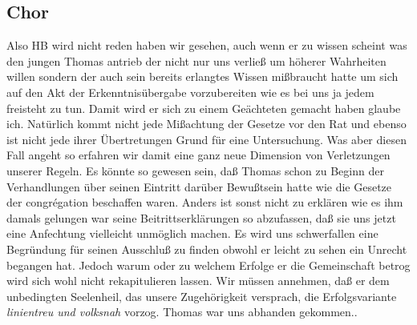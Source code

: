\documentclass[
]{article}
\author{}
\date{\vspace{-2.5em}}
\begin{document}
\subsection{Chor}\label{chor}

Also HB wird nicht reden haben wir gesehen, auch wenn er zu wissen
scheint was den jungen Thomas antrieb der nicht nur uns verließ um
höherer Wahrheiten willen sondern der auch sein bereits erlangtes Wissen
mißbraucht hatte um sich auf den Akt der Erkenntnisübergabe
vorzubereiten wie es bei uns ja jedem freisteht zu tun. Damit wird er
sich zu einem Geächteten gemacht haben glaube ich. Natürlich kommt nicht
jede Mißachtung der Gesetze vor den Rat und ebenso ist nicht jede ihrer
Übertretungen Grund für eine Untersuchung. Was aber diesen Fall angeht
so erfahren wir damit eine ganz neue Dimension von Verletzungen unserer
Regeln. Es könnte so gewesen sein, daß Thomas schon zu Beginn der
Verhandlungen über seinen Eintritt darüber Bewußtsein hatte wie die
Gesetze der congrégation beschaffen waren. Anders ist sonst nicht zu
erklären wie es ihm damals gelungen war seine Beitrittserklärungen so
abzufassen, daß sie uns jetzt eine Anfechtung vielleicht unmöglich
machen. Es wird uns schwerfallen eine Begründung für seinen Ausschluß zu
finden obwohl er leicht zu sehen ein Unrecht begangen hat. Jedoch warum
oder zu welchem Erfolge er die Gemeinschaft betrog wird sich wohl nicht
rekapitulieren lassen. Wir müssen annehmen, daß er dem unbedingten
Seelenheil, das unsere Zugehörigkeit versprach, die Erfolgsvariante
\emph{linientreu und volksnah} vorzog. Thomas war uns abhanden
gekommen..
\end{document}
